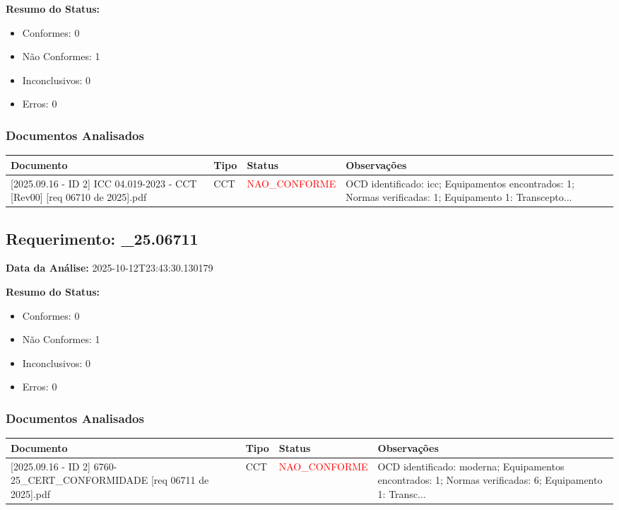 \documentclass[12pt,a4paper]{article}
\begin{document}
\textbf{Resumo do Status:}
\begin{itemize}
    \item Conformes: 0
    \item Não Conformes: 1
    \item Inconclusivos: 0
    \item Erros: 0
\end{itemize}

\subsubsection{Documentos Analisados}

\begin{longtable}{|p{4cm}|p{2cm}|p{2cm}|p{6cm}|}
\hline
\textbf{Documento} & \textbf{Tipo} & \textbf{Status} & \textbf{Observações} \\
\hline
\endhead
[Certificado de Conformidade Técnica - CCT][2025.09.16 - ID 2] ICC 04.019-2023 - CCT [Rev00] [req 06710 de  2025].pdf & CCT & \textcolor{red}{NAO\_CONFORME} & OCD identificado: icc; Equipamentos encontrados: 1; Normas verificadas: 1; Equipamento 1: Transcepto... \\
\hline
\end{longtable}


\subsection{Requerimento: \_25.06711}

\textbf{Data da Análise:} 2025-10-12T23:43:30.130179

\textbf{Resumo do Status:}
\begin{itemize}
    \item Conformes: 0
    \item Não Conformes: 1
    \item Inconclusivos: 0
    \item Erros: 0
\end{itemize}

\subsubsection{Documentos Analisados}

\begin{longtable}{|p{4cm}|p{2cm}|p{2cm}|p{6cm}|}
\hline
\textbf{Documento} & \textbf{Tipo} & \textbf{Status} & \textbf{Observações} \\
\hline
\endhead
[Certificado de Conformidade Técnica - CCT][2025.09.16 - ID 2] 6760-25\_CERT\_CONFORMIDADE [req 06711 de  2025].pdf & CCT & \textcolor{red}{NAO\_CONFORME} & OCD identificado: moderna; Equipamentos encontrados: 1; Normas verificadas: 6; Equipamento 1: Transc... \\
\hline
\end{longtable}
\end{document}
